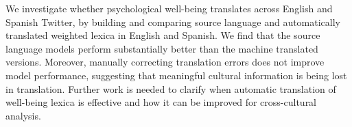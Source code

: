 We investigate whether psychological well-being translates across English and Spanish Twitter, by building and comparing source language and automatically translated weighted lexica in English and Spanish. We find that the source language models perform substantially better than the machine translated versions. Moreover, manually correcting translation errors does not improve model performance, suggesting that meaningful cultural information is being lost in translation. Further work is needed to clarify when automatic translation of well-being lexica is effective and how it can be improved for cross-cultural analysis.
